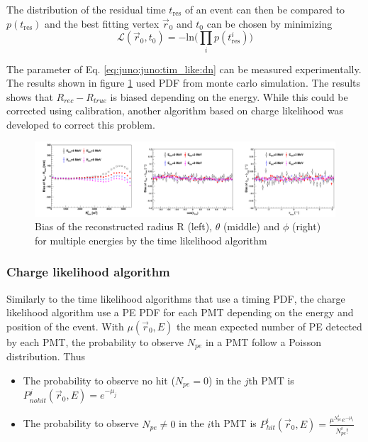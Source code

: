 The distribution of the residual time $t_{\mathrm{res}}$ of an event can then be compared to $p(t_{\mathrm{res}})$ and the best fitting vertex $\vec{r}_0$ and $t_0$ can be chosen by minimizing
\begin{equation}
  \mathcal{L}(\vec{r}_0, t_0) = - \mathrm{ln} \bigg(\prod_i p(t^i_{\mathrm{res}}) \bigg)
\end{equation}

The parameter of Eq. \ref{eq:juno:juno:tim_like:dn} can be measured experimentally. The results shown in figure \ref{fig:juno:rec:time_likelihood} used PDF from monte carlo simulation. The results shows that $R_{rec} - R_{true}$ is biased depending on the energy. While this could be corrected using calibration, another algorithm based on charge likelihood was developed to correct this problem.

\begin{figure}[ht]
  \centering
  \includegraphics[width=\linewidth]{images/juno/reco/time_likelihood_results.png}
  \caption{Bias of the reconstructed radius R (left), $\theta$ (middle) and $\phi$ (right) for multiple energies by the time likelihood algorithm}
  \label{fig:juno:rec:time_likelihood}
\end{figure}


\subsubsection{Charge likelihood algorithm}

Similarly to the time likelihood algorithms that use a timing PDF, the charge likelihood algorithm use a PE PDF for each PMT depending on the energy and position of the event. With $\mu(\vec{r}_0, E)$ the mean expected number of PE detected by each PMT, the probability to observe $N_{pe}$ in a PMT follow a Poisson distribution. Thus
\begin{itemize}
  \item The probability to observe no hit ($N_{pe} = 0$) in the $j$th PMT is $P^{j}_{nohit} (\vec{r}_0, E) = e^{-\mu_j}$
  \item The probability to observe $N_{pe} \neq 0$ in the $i$th PMT is $P^{i}_{hit} (\vec{r}_0, E) = \frac{\mu^{N^i_{pe}} e^{-\mu_i}}{N^i_{pe}!}$
\end{itemize}

